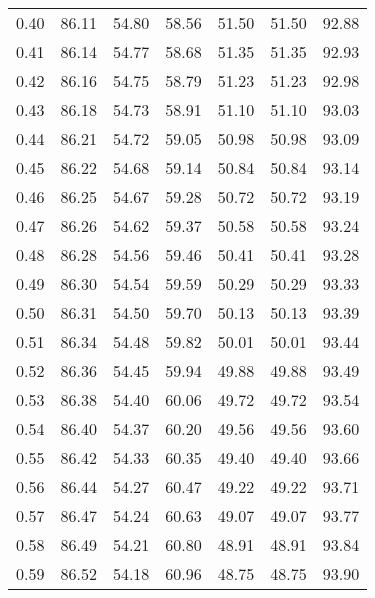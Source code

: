 \begin{tabular}{|c|c|c|c|c|c|c|}
      0.40 &     86.11 &     54.80 &      58.56 &   51.50 &      51.50 &         92.88 \\
      0.41 &     86.14 &     54.77 &      58.68 &   51.35 &      51.35 &         92.93 \\
      0.42 &     86.16 &     54.75 &      58.79 &   51.23 &      51.23 &         92.98 \\
      0.43 &     86.18 &     54.73 &      58.91 &   51.10 &      51.10 &         93.03 \\
      0.44 &     86.21 &     54.72 &      59.05 &   50.98 &      50.98 &         93.09 \\
      0.45 &     86.22 &     54.68 &      59.14 &   50.84 &      50.84 &         93.14 \\
      0.46 &     86.25 &     54.67 &      59.28 &   50.72 &      50.72 &         93.19 \\
      0.47 &     86.26 &     54.62 &      59.37 &   50.58 &      50.58 &         93.24 \\
      0.48 &     86.28 &     54.56 &      59.46 &   50.41 &      50.41 &         93.28 \\
      0.49 &     86.30 &     54.54 &      59.59 &   50.29 &      50.29 &         93.33 \\
      0.50 &     86.31 &     54.50 &      59.70 &   50.13 &      50.13 &         93.39 \\
      0.51 &     86.34 &     54.48 &      59.82 &   50.01 &      50.01 &         93.44 \\
      0.52 &     86.36 &     54.45 &      59.94 &   49.88 &      49.88 &         93.49 \\
      0.53 &     86.38 &     54.40 &      60.06 &   49.72 &      49.72 &         93.54 \\
      0.54 &     86.40 &     54.37 &      60.20 &   49.56 &      49.56 &         93.60 \\
      0.55 &     86.42 &     54.33 &      60.35 &   49.40 &      49.40 &         93.66 \\
      0.56 &     86.44 &     54.27 &      60.47 &   49.22 &      49.22 &         93.71 \\
      0.57 &     86.47 &     54.24 &      60.63 &   49.07 &      49.07 &         93.77 \\
      0.58 &     86.49 &     54.21 &      60.80 &   48.91 &      48.91 &         93.84 \\
      0.59 &     86.52 &     54.18 &      60.96 &   48.75 &      48.75 &         93.90 \\

\end{tabular}
